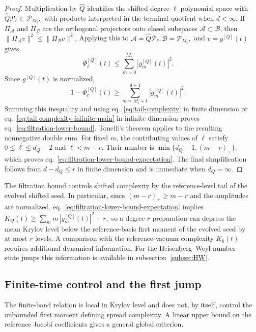 \documentclass[a4paper,11pt]{article}
\theoremstyle{definition}
\theoremstyle{remark}
\newcommand{\cP}{\mathcal P}
\newcommand{\Qhat}{\widehat Q}
\begin{document}
\begin{proof}
Multiplication by $\Qhat$ identifies the shifted degree-$\ell$ polynomial space with
$
   \Qhat\cP_\ell\subset\cP_{M_\ell},
$
with products interpreted in the terminal quotient when $d<\infty$. If
$\Pi_{\mathcal A}$ and $\Pi_{\mathcal B}$ are the orthogonal projectors onto closed subspaces
$\mathcal A\subset\mathcal B$, then
$
   \|\Pi_{\mathcal A}v\|^2
   \le
   \|\Pi_{\mathcal B}v\|^2.
$
Applying this to
$
   \mathcal A=\Qhat\cP_\ell,
   \mathcal B=\cP_{M_\ell},
$
and $v=g^{[Q]}(t)$ gives
\begin{equation}
   \Phi_\ell^{[Q]}(t)
   \le
   \sum_{m=0}^{M_\ell}
   |g_m^{[Q]}(t)|^2.
\end{equation}
Since $g^{[Q]}(t)$ is normalized,
\begin{equation}
   1-\Phi_\ell^{[Q]}(t)
   \ge
   \sum_{m=M_\ell+1}^{d-1}
   |g_m^{[Q]}(t)|^2.
\end{equation}
Summing this inequality and using
eq.~\eqref{eq:tail-complexity} in finite dimension or
eq.~\eqref{eq:tail-complexity-infinite-main} in infinite dimension proves
eq.~\eqref{eq:filtration-lower-bound}. Tonelli's theorem \cite{Folland1999} applies to the resulting nonnegative double sum. For fixed $m$, the contributing values of $\ell$ satisfy
$
   0\le\ell\le d_Q-2
$
and
$
   \ell<m-r.
$
Their number is
$
   \min\{d_Q-1,(m-r)_+\},
$
which proves eq.~\eqref{eq:filtration-lower-bound-expectation}. The final simplification follows from
$d-d_Q\le r$ in finite dimension and is immediate when $d_Q=\infty$.
\end{proof}

The filtration bound controls shifted complexity by the reference-level tail of the evolved shifted seed. In particular, since $(m-r)_+\ge m-r$ and the amplitudes are normalized, eq.~\eqref{eq:filtration-lower-bound-expectation} implies
$
   K_Q(t)\ge\sum_{m}m\,|g_m^{[Q]}(t)|^2-r,
$
so a degree-$r$ preparation can depress the mean Krylov level below the reference-basis first
moment of the evolved seed by at most $r$ levels. A comparison with the reference-vacuum complexity $K_0(t)$ requires additional dynamical information. For the Heisenberg--Weyl number-state jumps this information is available in subsection~\ref{subsec:HW}.

\subsection{Finite-time control and the first jump}
\label{subsec:finite-time-first-jump}
The finite-band relation is local in Krylov level and does not, by itself,
control the unbounded first moment defining spread complexity.  A linear
upper bound on the reference Jacobi coefficients gives a general global
criterion.
\end{document}
